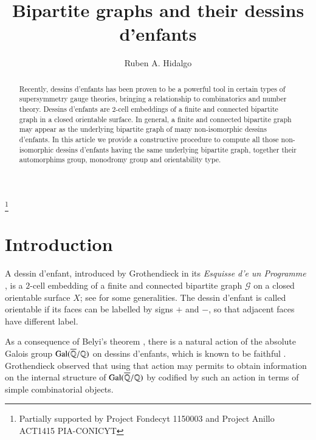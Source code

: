 \documentclass[12pt]{amsart}
\theoremstyle{remark}
\begin{document}
\title{Bipartite graphs and their dessins d'enfants}

\author{Ruben A. Hidalgo}
\address{Departamento de Matem\'atica y Estad\'{\i}stica, Universidad de La Frontera. Casilla 54-D, 4780000 Temuco, Chile}

\thanks{Partially supported by Project Fondecyt 1150003 and Project Anillo ACT1415 PIA-CONICYT}
\maketitle

\begin{abstract}
Recently, dessins d'enfants has been proven to be a powerful tool in certain types of supersymmetry gauge theories, bringing a relationship to combinatorics and number theory. Dessins d'enfants are $2$-cell embeddings of a finite and connected bipartite graph in a closed orientable surface. In general, a finite and connected bipartite graph may appear as the underlying bipartite graph of many non-isomorphic dessins d'enfants. 
In this article we provide a constructive procedure to compute all those non-isomorphic dessins d'enfants having the same underlying bipartite graph, together their automorphims group, monodromy group and orientability type. 
\end{abstract}

\section{Introduction}
A dessin d'enfant, introduced by Grothendieck in its {\it Esquisse d'e un Programme} \cite{Gro}, 
is a $2$-cell embedding of a finite and connected bipartite graph ${\mathcal G}$ on a closed orientable surface $X$; see  \cite{GiGo,JS,LZ,Sch,Wolfart1,Wolfart2} for some generalities. The dessin d'enfant is called orientable if its faces can be labelled by signs $+$ and $-$, so that adjacent faces have different label.

As a consequence of Belyi's theorem \cite{Belyi}, there is a natural action of the absolute Galois group ${\rm Gal}(\overline{\mathbb Q}/{\mathbb Q})$ on dessins d'enfants, which is known to be faithful \cite{Gro,GiGo, GiGo1, Sch}.  Grothendieck observed that using that action may permits to obtain information on the internal structure of ${\rm Gal}(\overline{\mathbb Q}/{\mathbb Q})$ by codified by such an action in terms of simple combinatorial objects. 
\end{document}
